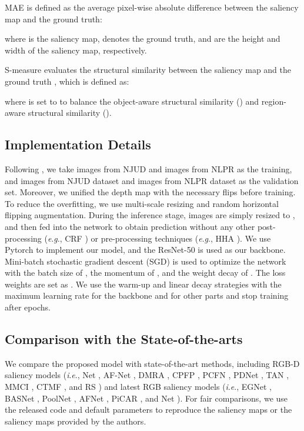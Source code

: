 \documentclass[journal]{IEEEtran}
\newcommand{\ie}{\textit{i}.\textit{e}.}
\newcommand{\eg}{\textit{e}.\textit{g}.}
\begin{document}
 MAE is defined as the average pixel-wise absolute difference between the saliency map and the ground truth:
 
where  is the saliency map,  denotes the ground truth,  and  are the height and width of the saliency map, respectively.

S-measure evaluates the structural similarity between the saliency map and the ground truth \cite{fan2017structure}, which is defined as:
 
where  is set to  to balance the object-aware structural similarity () and region-aware structural similarity ().



\subsection{Implementation Details}
Following \cite{chen2018progressively}, we take  images from NJUD \cite{ju2014depth} and  images from NLPR \cite{peng2014rgbd} as the training, and  images from NJUD dataset and  images from NLPR dataset as the validation set. Moreover, we unified the depth map with the necessary flips before training. To reduce the overfitting, we use multi-scale resizing and random horizontal flipping augmentation. During the inference stage, images are simply resized to , and then fed into the network to obtain prediction without any other post-processing (\eg, CRF \cite{krahenbuhl2011efficient}) or pre-processing techniques (\eg, HHA \cite{gupta2014learning}). We use Pytorch to implement our model, and the ResNet-50 \cite{he2016deep} is used as our backbone. Mini-batch stochastic gradient descent (SGD) is used to optimize the network with the batch size of , the momentum of , and the weight decay of . The loss weights are set as . We use the warm-up and linear decay strategies with the maximum learning rate  for the backbone and  for other parts and stop training after  epochs.
\subsection{Comparison with the State-of-the-arts}

We compare the proposed model with  state-of-the-art methods, including  RGB-D saliency models (\ie, Net \cite{fan2019D3Net}, AF-Net \cite{wang2019adaptive}, DMRA \cite{Piao_2019_ICCV}, CPFP \cite{zhao2019contrast}, PCFN \cite{chen2018progressively}, PDNet \cite{zhu2019pdnet}, TAN \cite{chen2019three}, MMCI \cite{chen2019multi}, CTMF \cite{han2017cnns}, and RS \cite{shigematsu2017learning}) and  latest RGB saliency models (\ie, EGNet \cite{zhao2019EGNet}, BASNet \cite{Qin_2019_CVPR}, PoolNet \cite{Liu2019PoolSal}, AFNet \cite{feng2019attentive}, PiCAR \cite{liu2018picanet}, and Net \cite{deng2018r3net}).
For fair comparisons, we use the released code and default parameters to reproduce the saliency maps or the saliency maps provided by the authors.
\\ 
\end{document}
